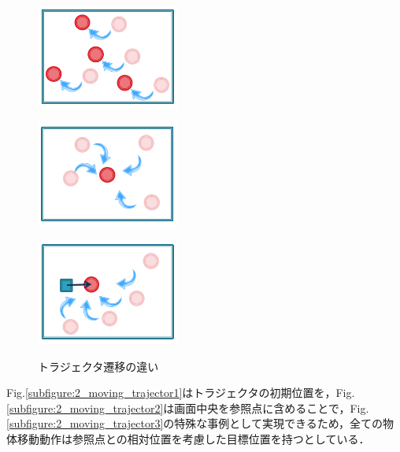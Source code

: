 \begin{figure}[h]
	\centering
	\begin{minipage}[t]{.3\textwidth}
		\centering
		\includegraphics[width=4.7cm]{figure1_sub_a.png} \\ %
		\label{subfigure:2_moving_trajector1}    
	\end{minipage}
	\begin{minipage}[t]{.3\textwidth}
		\centering
		\includegraphics[width=4.7cm]{figure1_sub_b.png} \\ %
		\label{subfigure:2_moving_trajector2}
	\end{minipage}
	\begin{minipage}[t]{.3\textwidth}
		\centering
		\includegraphics[width=4.7cm]{figure1_sub_c.png} \\ %
		\label{subfigure:2_moving_trajector3}
	\end{minipage}
	\caption{トラジェクタ遷移の違い}
	\label{figure:2_moving_trajector}
\end{figure}
Fig.\ref{subfigure:2_moving_trajector1}はトラジェクタの初期位置を，Fig.\ref{subfigure:2_moving_trajector2}は画面中央を参照点に含めることで，Fig.\ref{subfigure:2_moving_trajector3}の特殊な事例として実現できるため，全ての物体移動動作は参照点との相対位置を考慮した目標位置を持つとしている．

